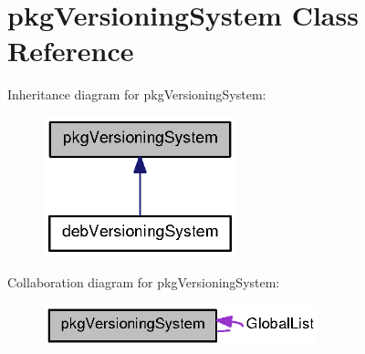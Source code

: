 \section{pkg\-Versioning\-System \-Class \-Reference}
\label{classpkgVersioningSystem}


\-Inheritance diagram for pkg\-Versioning\-System\-:
\nopagebreak
\begin{figure}[H]
\begin{center}
\leavevmode
\includegraphics[width=158pt]{classpkgVersioningSystem__inherit__graph}
\end{center}
\end{figure}


\-Collaboration diagram for pkg\-Versioning\-System\-:
\nopagebreak
\begin{figure}[H]
\begin{center}
\leavevmode
\includegraphics[width=225pt]{classpkgVersioningSystem__coll__graph}
\end{center}
\end{figure}
